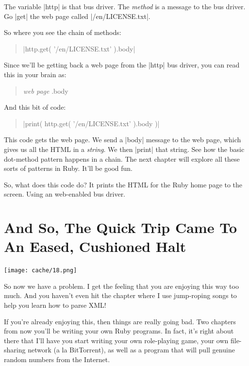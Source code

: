 \documentclass[12pt,twoside]{report}
\begin{document}
The variable \rubyinline|http| is that bus driver.
The {\em method} is a message to the bus driver.  Go
\rubyinline|get| the web page called
\consoleinline|/en/LICENSE.txt|.

So where you see the chain of methods:

\begin{quote}
\rubyinline|http.get( '/en/LICENSE.txt' ).body|\end{quote}


Since we'll be getting back a web page from the
\rubyinline|http| bus driver, you can read this in
your brain as:

\begin{quote}
{\em web page} .body\end{quote}


And this bit of code:

\begin{quote}
\rubyinline|print( http.get( '/en/LICENSE.txt' ).body )|\end{quote}


This code gets the web page.  We send a
\rubyinline|body| message to the web page, which gives
us all the HTML in a {\em string}.  We then
\rubyinline|print| that string.  See how the basic
dot-method pattern happens in a chain.  The next chapter will explore
all these sorts of patterns in Ruby.  It'll be good fun.

So, what does this code do?  It prints the HTML for the Ruby home page
to the screen.  Using an web-enabled bus driver.


\section{And So, The Quick Trip Came To An Eased, Cushioned Halt}


	\texttt{[image: cache/18.png]}

So now we have a problem.  I get the feeling that you are enjoying
this way too much. And you haven't even hit the chapter where I use
jump-roping songs to help you learn how to parse XML!

If you're already enjoying this, then things are really going bad.
Two chapters from now you'll be writing your own Ruby programs.  In
fact, it's right about there that I'll have you start writing your own
role-playing game, your own file-sharing network (a la BitTorrent), as
well as a program that will pull genuine random numbers from the
Internet.

\end{document}
